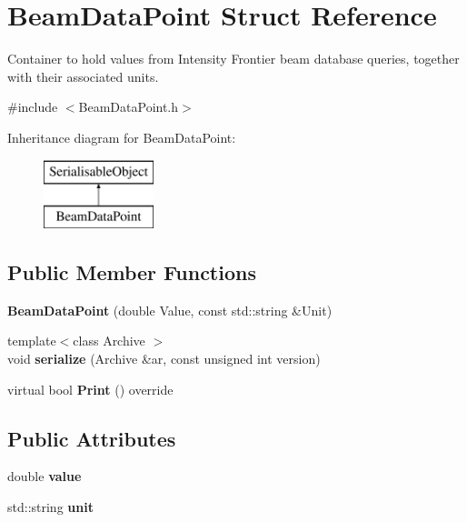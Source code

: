 \hypertarget{structBeamDataPoint}{\section{Beam\-Data\-Point Struct Reference}
\label{structBeamDataPoint}
}


Container to hold values from Intensity Frontier beam database queries, together with their associated units.  




{\ttfamily \#include $<$Beam\-Data\-Point.\-h$>$}

Inheritance diagram for Beam\-Data\-Point\-:\begin{figure}[H]
\begin{center}
\leavevmode
\includegraphics[height=2.000000cm]{structBeamDataPoint}
\end{center}
\end{figure}
\subsection*{Public Member Functions}
\begin{DoxyCompactItemize}
\item 
\hypertarget{structBeamDataPoint_ad98646938f8e5337563523d7d0a198b4}{{\bfseries Beam\-Data\-Point} (double Value, const std\-::string \&Unit)}\label{structBeamDataPoint_ad98646938f8e5337563523d7d0a198b4}

\item 
\hypertarget{structBeamDataPoint_a6369107cfd88d05e8b434da0e234d546}{{\footnotesize template$<$class Archive $>$ }\\void {\bfseries serialize} (Archive \&ar, const unsigned int version)}\label{structBeamDataPoint_a6369107cfd88d05e8b434da0e234d546}

\item 
\hypertarget{structBeamDataPoint_aaa7b4c28dfad7d79f92c6d60001d36ac}{virtual bool {\bfseries Print} () override}\label{structBeamDataPoint_aaa7b4c28dfad7d79f92c6d60001d36ac}

\end{DoxyCompactItemize}
\subsection*{Public Attributes}
\begin{DoxyCompactItemize}
\item 
\hypertarget{structBeamDataPoint_ab877fc81dd293f30ec6475f9649cddd0}{double {\bfseries value}}\label{structBeamDataPoint_ab877fc81dd293f30ec6475f9649cddd0}

\item 
\hypertarget{structBeamDataPoint_a0a0e275d6a6bc2631c4103eb7e2b44e4}{std\-::string {\bfseries unit}}\label{structBeamDataPoint_a0a0e275d6a6bc2631c4103eb7e2b44e4}

\end{DoxyCompactItemize}
